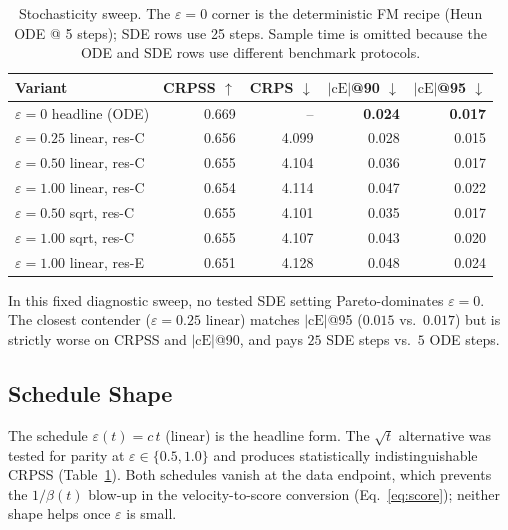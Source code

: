 \documentclass{tpm2026}
\begin{document}
\begin{table}[!h]
  \centering
  \caption{Stochasticity sweep. The $\varepsilon=0$ corner is the deterministic FM recipe (Heun ODE @ 5 steps); SDE rows use 25 steps. Sample time is omitted because the ODE and SDE rows use different benchmark protocols.}\label{tab:stoch-eps}
  \footnotesize
  \begin{tabular}{lrrrr}
    \toprule
    Variant & CRPSS $\uparrow$ & CRPS $\downarrow$ & $|\text{cE}|$@90 $\downarrow$ & $|\text{cE}|$@95 $\downarrow$ \\
    \midrule
    $\varepsilon=0$ headline (ODE)    & 0.669 & --     & \textbf{0.024} & \textbf{0.017} \\
    $\varepsilon=0.25$ linear, res-C  & 0.656 & 4.099  & 0.028 & 0.015 \\
    $\varepsilon=0.50$ linear, res-C  & 0.655 & 4.104  & 0.036 & 0.017 \\
    $\varepsilon=1.00$ linear, res-C  & 0.654 & 4.114  & 0.047 & 0.022 \\
    $\varepsilon=0.50$ sqrt, res-C    & 0.655 & 4.101  & 0.035 & 0.017 \\
    $\varepsilon=1.00$ sqrt, res-C    & 0.655 & 4.107  & 0.043 & 0.020 \\
    $\varepsilon=1.00$ linear, res-E  & 0.651 & 4.128  & 0.048 & 0.024 \\
    \bottomrule
  \end{tabular}
\end{table}

In this fixed diagnostic sweep, no tested SDE setting Pareto-dominates $\varepsilon=0$. The closest contender ($\varepsilon=0.25$ linear) matches $|\text{cE}|$@95 ($0.015$ vs.\ $0.017$) but is strictly worse on CRPSS and $|\text{cE}|$@90, and pays $25$ SDE steps vs.\ $5$ ODE steps.

\subsection{Schedule Shape}\label{app:stoch-schedule}

The schedule $\varepsilon(t) = c\,t$ (linear) is the headline form. The $\sqrt{t}$ alternative was tested for parity at $\varepsilon \in \{0.5, 1.0\}$ and produces statistically indistinguishable CRPSS (Table~\ref{tab:stoch-eps}). Both schedules vanish at the data endpoint, which prevents the $1/\beta(t)$ blow-up in the velocity-to-score conversion (Eq.~\eqref{eq:score}); neither shape helps once $\varepsilon$ is small.
\end{document}
